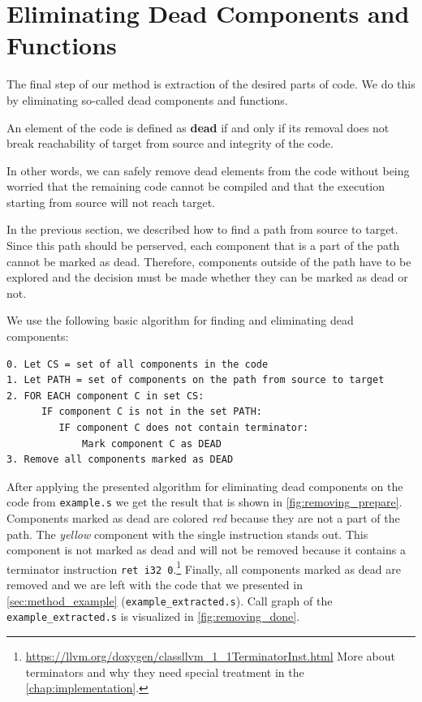 \documentclass[12pt, twoside]{fithesis2}
\renewcommand{\_}{\leavevmode \kern0.07em\vbox{\hrule width0.4em}}
\begin{document}
\section{Eliminating Dead Components and Functions}
\label{sec:design-removing}

The final step of our method is extraction of the desired parts of code.
We do this by eliminating so-called dead components and functions.

An element of the code is defined as \textbf{dead} if and only if its removal
does not break reachability of target from source and integrity of the code.

In other words, we can safely remove dead elements from the code without being
worried that the remaining code cannot be compiled and that the execution
starting from source will not reach target.

In the previous section, we described how to find a path from source to target.
Since this path should be perserved, each component that is a part of the path
cannot be marked as dead.
Therefore, components outside of the path have to be explored and the decision
must be made whether they can be marked as dead or not.

We  use the following basic algorithm for finding and eliminating dead
components:

\begin{verbatim}
0. Let CS = set of all components in the code
1. Let PATH = set of components on the path from source to target
2. FOR EACH component C in set CS:
      IF component C is not in the set PATH:
         IF component C does not contain terminator:
             Mark component C as DEAD
3. Remove all components marked as DEAD
\end{verbatim}


After applying the presented algorithm for eliminating dead components on the
code from \texttt{example.s} we get the result that is shown
in \autoref{fig:removing_prepare}.
Components marked as dead are colored \emph{red} because they are not
a part of the path.
The \emph{yellow} component with the single instruction stands out.
This component is not marked as dead and will not be removed because it contains
a terminator instruction \texttt{ret i32 0}.\footnote{
\url{https://llvm.org/doxygen/classllvm_1_1TerminatorInst.html}
More about terminators and why they need special treatment in the
\autoref{chap:implementation}.
}
Finally, all components marked as dead are removed and we are left with the
code that we presented in \autoref{sec:method_example}
(\texttt{example_extracted.s}).
Call graph of the \texttt{example_extracted.s} is visualized in
\autoref{fig:removing_done}.
\end{document}
